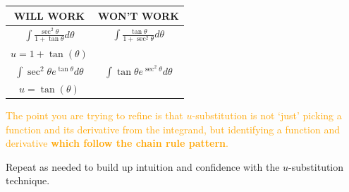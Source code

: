\documentclass{ximera}
\begin{document}
\begin{exercise}
\begin{enumerate}
        \begin{center}
        \begin{tabular}{cc}
        WILL WORK & WON'T WORK\\\hline
        $\int\frac{\sec^2 \theta}{1+\tan\theta}d\theta$ & $\int\frac{\tan \theta }{1+\sec^2\theta}d\theta$\\
        $u=1+\tan(\theta)$ & \\\hline
        $\int \sec^2 \theta e^{\tan \theta} d\theta$ &$\int \tan \theta e^{\sec^2 \theta}d\theta $  \\
        $u=\tan(\theta)$ & \\
        \end{tabular}\end{center}
        \textcolor{orange}{The point you are trying to refine is that $u$-substitution is not `just' picking a function and its derivative from the integrand, but identifying a function and derivative \textbf{which follow the chain rule pattern}.}


    
    Repeat as needed to build up intuition and confidence with the $u$-substitution technique.
    
        \end{enumerate}
\end{exercise}
\end{document}
